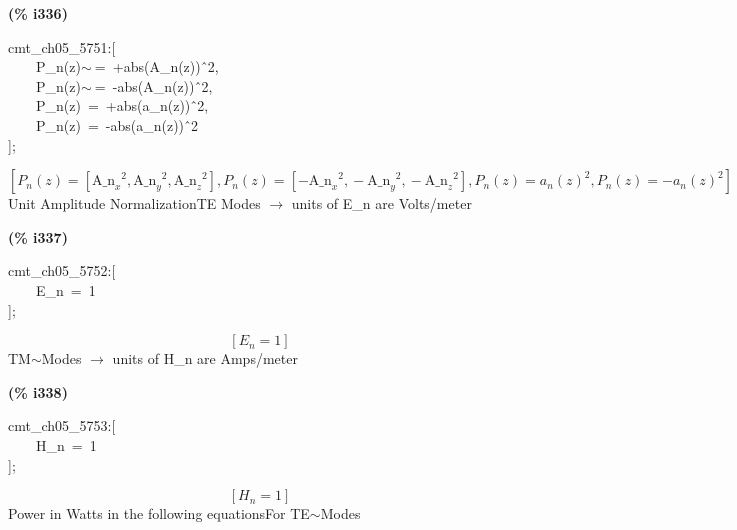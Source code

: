 \documentclass[fleqn]{article}
\begin{document}
\noindent
\begin{minipage}[t]{4.000000em}\color{red}\bfseries
(\% i336)	
\end{minipage}
\begin{minipage}[t]{\textwidth}\color{blue}
cmt\_ch05\_5751:[\\
\ \ \ \ P\_n(z)\ensuremath{\sim\ }=\ +abs(A\_n(z))\^\ 2,\ \\
\ \ \ \ P\_n(z)\ensuremath{\sim\ }=\ -abs(A\_n(z))\^\ 2,\ \\
\ \ \ \ P\_n(z)\ =\ +abs(a\_n(z))\^\ 2,\\
\ \ \ \ P\_n(z)\ =\ -abs(a\_n(z))\^\ 2\\
];
\end{minipage}
\[\displaystyle \tag{\% o336} 
\operatorname{[}{P_n}(z)=\left[ {{{{\ensuremath{\mathrm{A\_ n}}}_x}}^{2}}\operatorname{,}{{{{\ensuremath{\mathrm{A\_ n}}}_y}}^{2}}\operatorname{,}{{{{\ensuremath{\mathrm{A\_ n}}}_z}}^{2}}\right] \operatorname{,}{P_n}(z)=\left[ -{{{{\ensuremath{\mathrm{A\_ n}}}_x}}^{2}}\operatorname{,}-{{{{\ensuremath{\mathrm{A\_ n}}}_y}}^{2}}\operatorname{,}-{{{{\ensuremath{\mathrm{A\_ n}}}_z}}^{2}}\right] \operatorname{,}{P_n}(z)={{{a_n}(z)}^{2}}\operatorname{,}{P_n}(z)=-
{{{a_n}(z)}^{2}}\operatorname{]}\mbox{}
\]
Unit Amplitude NormalizationTE Modes \ensuremath{\longrightarrow} units of E\_n are Volts/meter


\noindent
\begin{minipage}[t]{4.000000em}\color{red}\bfseries
(\% i337)	
\end{minipage}
\begin{minipage}[t]{\textwidth}\color{blue}
cmt\_ch05\_5752:[\\
\ \ \ \ E\_n\ =\ 1\\
];
\end{minipage}
\[\displaystyle \tag{\% o337} 
\left[ {E_n}=1\right] \mbox{}
\]
TM\ensuremath{\sim }Modes \ensuremath{\longrightarrow} units of H\_n are Amps/meter


\noindent
\begin{minipage}[t]{4.000000em}\color{red}\bfseries
(\% i338)	
\end{minipage}
\begin{minipage}[t]{\textwidth}\color{blue}
cmt\_ch05\_5753:[\\
\ \ \ \ H\_n\ =\ 1\\
];
\end{minipage}
\[\displaystyle \tag{\% o338} 
\left[ {H_n}=1\right] \mbox{}
\]
Power in Watts in the following equationsFor TE\ensuremath{\sim }Modes
\end{document}
